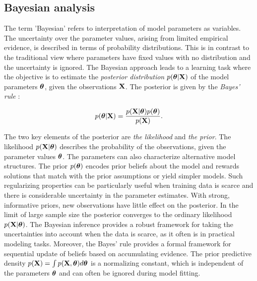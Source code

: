 \subsection{Bayesian analysis}\label{sec:bayes}

The term 'Bayesian' refers to interpretation of model parameters as
variables. The uncertainty over the parameter values, arising from
limited empirical evidence, is described in terms of probability
distributions. This is in contrast to the traditional view where
parameters have fixed values with no distribution and the uncertainty
is ignored. The Bayesian approach leads to a learning task where the
objective is to estimate the \emph{posterior distribution} $p(\boldsymbol{\theta}|\mathbf{X})$
of the model parameters \(\boldsymbol{\theta}\), given the observations \(\mathbf{X}\). The
posterior is given by the \emph{Bayes' rule} \citep{Bayes63}:

\begin{equation}\label{eq:bayesrule}
  p(\boldsymbol{\theta}|\mathbf{X}) = \frac{p(\mathbf{X}|\boldsymbol{\theta})p(\boldsymbol{\theta})}{p(\mathbf{X})}.
\end{equation}

\noindent The two key elements of the posterior are {\it the
likelihood} and {\it the prior}. The likelihood \(p(\mathbf{X}|\boldsymbol{\theta})\)
describes the probability of the observations, given the parameter
values \(\boldsymbol{\theta}\). The parameters can also characterize alternative
model structures. The prior \(p(\boldsymbol{\theta})\) encodes prior beliefs about
the model and rewards solutions that match with the prior assumptions or
yield simpler models. Such regularizing properties can be particularly
useful when training data is scarce and there is considerable
uncertainty in the parameter estimates. With strong, informative
priors, new observations have little effect on the posterior. In the
limit of large sample size the posterior converges to the ordinary
likelihood \(p(\mathbf{X}|\boldsymbol{\theta})\). The Bayesian inference provides a robust
framework for taking the uncertainties into account when the data is
scarce, as it often is in practical modeling tasks.  Moreover, the
Bayes' rule provides a formal framework for sequential update of
beliefs based on accumulating evidence. The prior predictive density
$p(\mathbf{X}) = \int p(\mathbf{X},\boldsymbol{\theta}) d\boldsymbol{\theta}$ is a normalizing constant, which is
independent of the parameters $\boldsymbol{\theta}$ and can often be ignored during
model fitting. 

